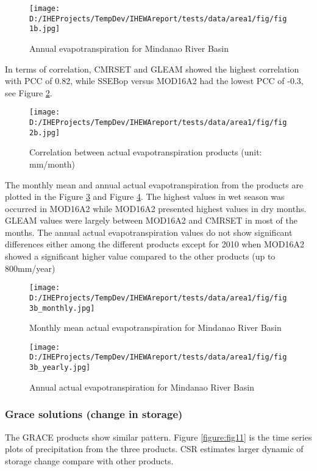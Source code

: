 \documentclass{article}%
\begin{document}
\begin{figure}[H]%
\centering%
\texttt{[image: D:/IHEProjects/TempDev/IHEWAreport/tests/data/area1/fig/fig1b.jpg]}%
\caption{Annual evapotranspiration  for Mindanao River Basin}%
\label{figure:fig7}%
\end{figure}

%
In terms of correlation, CMRSET and GLEAM showed the highest correlation with PCC of 0.82, while  SSEBop versus  MOD16A2 had the lowest PCC of  -0.3, see Figure \ref{figure:fig8}.%
\linebreak%


\begin{figure}[H]%
\centering%
\texttt{[image: D:/IHEProjects/TempDev/IHEWAreport/tests/data/area1/fig/fig2b.jpg]}%
\caption{Correlation between actual evapotranspiration products (unit: mm/month)}%
\label{figure:fig8}%
\end{figure}

%
The monthly mean and annual actual evapotranspiration from the products are plotted in the Figure \ref{figure:fig9} and Figure \ref{figure:fig10}. The highest values in wet season was occurred in MOD16A2 while MOD16A2 presented highest values in dry months. GLEAM values were largely between MOD16A2 and CMRSET in most of the months.%
\linebreak%
The annual actual evapotranspiration values do not show significant differences either among the different products except for 2010 when MOD16A2 showed a significant higher value compared to the other products (up to 800mm/year)%
\linebreak%


\begin{figure}[H]%
\centering%
\texttt{[image: D:/IHEProjects/TempDev/IHEWAreport/tests/data/area1/fig/fig3b\_monthly.jpg]}%
\caption{Monthly mean actual evapotranspiration for Mindanao River Basin}%
\label{figure:fig9}%
\end{figure}

%


\begin{figure}[H]%
\centering%
\texttt{[image: D:/IHEProjects/TempDev/IHEWAreport/tests/data/area1/fig/fig3b\_yearly.jpg]}%
\caption{Annual actual evapotranspiration for Mindanao River Basin}%
\label{figure:fig10}%
\end{figure}

%
\subsubsection{Grace solutions (change in storage)}%
\label{ssubsec:Gracesolutions(changeinstorage)}%
The GRACE products show similar pattern. Figure \ref{figure:fig11} is the time series plots of precipitation from the three products. CSR estimates larger dynamic of storage change compare with other products.%
\linebreak%
\end{document}
